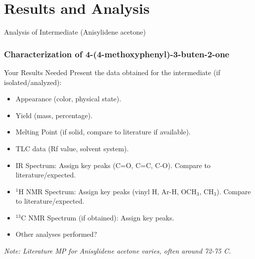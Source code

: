 \documentclass[10pt]{beamer}
\begin{document}
\section{Results and Analysis}

\begin{frame}{Analysis of Intermediate (Anisylidene acetone)}
    \frametitle{Characterization of 4-(4-methoxyphenyl)-3-buten-2-one}
     \begin{alertblock}{Your Results Needed}
        Present the data obtained for the intermediate (if isolated/analyzed):
        \begin{itemize}
            \item Appearance (color, physical state).
            \item Yield (mass, percentage).
            \item Melting Point (if solid, compare to literature if available).
            \item TLC data (Rf value, solvent system).
            \item IR Spectrum: Assign key peaks (C=O, C=C, C-O). Compare to literature/expected.
            \item $^1$H NMR Spectrum: Assign key peaks (vinyl H, Ar-H, OCH$_3$, CH$_3$). Compare to literature/expected.
            \item $^{13}$C NMR Spectrum (if obtained): Assign key peaks.
            \item Other analyses performed?
        \end{itemize}
     \end{alertblock}
     \textit{Note: Literature MP for Anisylidene acetone varies, often around 72-75 \textdegree C.}
\end{frame}
\end{document}
